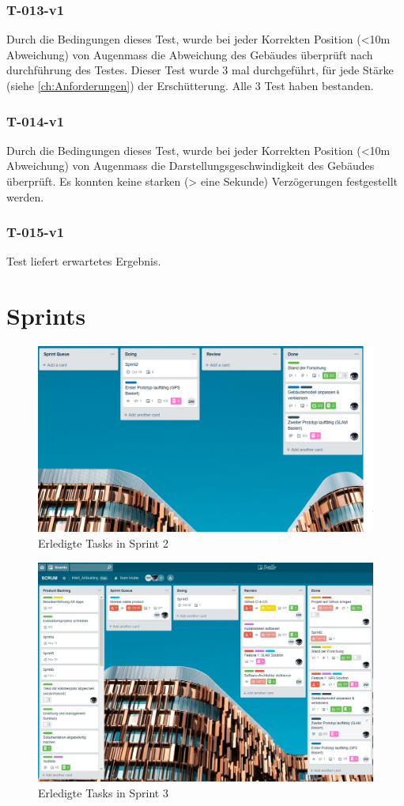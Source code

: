 \documentclass[a4paper]{scrreprt}
\begin{document}
\subsection*{T-013-v1}
Durch die Bedingungen dieses Test, wurde bei jeder Korrekten Position (<10m Abweichung) von Augenmass die Abweichung des Gebäudes überprüft nach durchführung des Testes.
Dieser Test wurde 3 mal durchgeführt, für jede Stärke (siehe \ref{ch:Anforderungen}) der Erschütterung.
Alle 3 Test haben bestanden.
\subsection*{T-014-v1}
Durch die Bedingungen dieses Test, wurde bei jeder Korrekten Position (<10m Abweichung) von Augenmass die Darstellungsgeschwindigkeit des Gebäudes überprüft. Es konnten keine starken (> eine Sekunde) Verzögerungen festgestellt werden.
\subsection*{T-015-v1}
Test liefert erwartetes Ergebnis.
\chapter*{Sprints}

\begin{figure}[h!]
	\includegraphics[keepaspectratio,width=\textwidth]{SprintReview_2}
	\caption{Erledigte Tasks in Sprint 2}
\end{figure}

\begin{figure}[h!]
	\includegraphics[keepaspectratio,width=\textwidth]{SprintReview_3}
	\caption{Erledigte Tasks in Sprint 3}
\end{figure}
\end{document}
